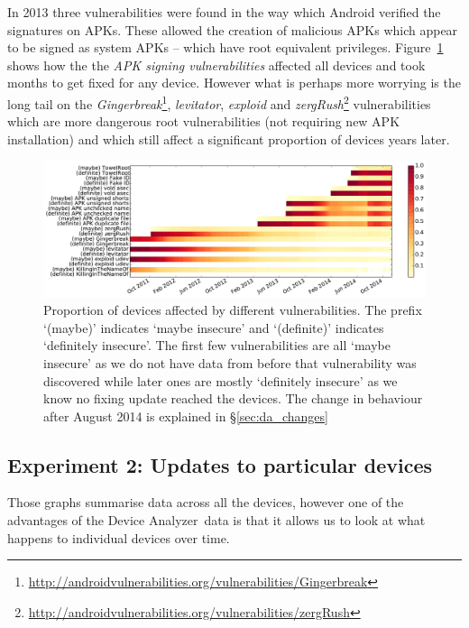 \documentclass[conference,a4paper,twoside]{IEEEtran}
\newcommand{\da}{Device Analyzer}
\begin{document}
In 2013 three vulnerabilities were found in the way which Android verified the signatures on APKs.
These allowed the creation of malicious APKs which appear to be signed as system APKs -- which have root equivalent privileges.
Figure~\ref{fig:nvulnerabilities_heat} shows how the the \emph{APK signing vulnerabilities} affected all devices and took months to get fixed for any device.
However what is perhaps more worrying is the long tail on the \emph{Gingerbreak}\footnote{\url{http://androidvulnerabilities.org/vulnerabilities/Gingerbreak}}, \emph{levitator}, \emph{exploid} and \emph{zergRush}\footnote{\url{http://androidvulnerabilities.org/vulnerabilities/zergRush}} vulnerabilities which are more dangerous root vulnerabilities (not requiring new APK installation) and which still affect a significant proportion of devices years later.


\begin{figure}
 \includegraphics[width=\textwidth]{figures/nvulnerabilities_heat.pdf}
 \caption{Proportion of devices affected by different vulnerabilities. The prefix `(maybe)' indicates `maybe insecure' and `(definite)' indicates `definitely insecure'. The first few vulnerabilities are all `maybe insecure' as we do not have data from before that vulnerability was discovered while later ones are mostly `definitely insecure' as we know no fixing update reached the devices. The change in behaviour after August 2014 is explained in \S\ref{sec:da_changes}}
 \label{fig:nvulnerabilities_heat}
\end{figure}


\subsection{Experiment 2: Updates to particular devices}\label{sec:exp:device_updates}
Those graphs summarise data across all the devices, however one of the advantages of the \da\ data is that it allows us to look at what happens to individual devices over time.
\end{document}
